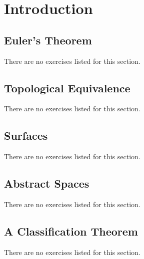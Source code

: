 \documentclass{book}
\begin{document}
\clearpage
\chapter{Introduction} \label{chapter:intro}
\section{Euler's Theorem}
There are no exercises listed for this section.
\section{Topological Equivalence}
There are no exercises listed for this section.
\section{Surfaces}
There are no exercises listed for this section.
\section{Abstract Spaces}
There are no exercises listed for this section.
\section{A Classification Theorem}
There are no exercises listed for this section.
\end{document}
